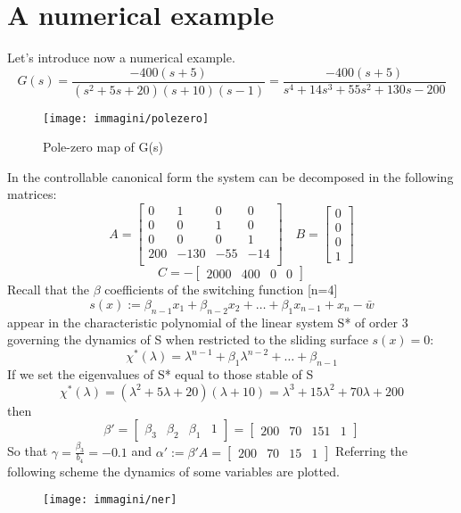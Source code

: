 \section{A numerical example}
Let's introduce now a numerical example.\[G(s)=\frac{-400(s+5)}{(s^2+5s+20)(s+10)(s-1)}=\frac{-400(s+5)}{s^4+14s^3+55s^2+130s-200}\]
\begin{figure}[H]
	\centering
	\texttt{[image: immagini/polezero]}
	\caption{Pole-zero map of G(s)}
	\label{fig:polezero}
\end{figure}
In the controllable canonical form the system can be decomposed in the following matrices:
\begin{equation*}
	A=\begin{bmatrix}
		0 & 1 & 0 & 0 \\
		0 & 0 & 1 &  0 \\
		0 & 0 & 0& 1 \\
		200& -130 & -55 & -14 \\
	\end{bmatrix}\quad 
	B=\begin{bmatrix}
		0	\\
		0	\\
		0\\
		1
	\end{bmatrix}
\end{equation*}
\[C=-\begin{bmatrix}
2000&400  & 0 & 0 
\end{bmatrix}
\]
Recall that the $\beta$ coefficients of the switching function [n=4]
\[s(x):=\beta_{n-1}x_1+\beta_{n-2}x_2+\dots+\beta_1x_{n-1}+x_n-\bar{w}\]
appear in the characteristic polynomial of the linear system S* of order 3 governing the dynamics of S when restricted to the sliding surface $s(x) = 0$:\[\chi^*(\lambda)=\lambda^{n-1}+\beta_1\lambda^{n-2}+\dots+\beta_{n-1}\]If we set the eigenvalues of S* equal to those stable of S
\[
\chi^*(\lambda)=(\lambda^2+5\lambda+20)(\lambda+10)=\lambda^3+15\lambda^2+70\lambda+200
\] then \[
 \beta'=\begin{bmatrix}
	\beta_3 & \beta_2 & \beta_1 & 1
	\end{bmatrix}=\begin{bmatrix}
200 &70 & 151 & 1
	\end{bmatrix}\] So that $\gamma=\frac{\beta_3}{b_4}=-0.1$ and $\alpha':= \beta'A=\begin{bmatrix}
	200 & 70 & 15 & 1
\end{bmatrix}$
Referring the following scheme the dynamics of some variables are plotted.
\begin{figure}[H]
	\centering
	\texttt{[image: immagini/ner]}
	\caption{}
	\label{fig:ner}
\end{figure}
